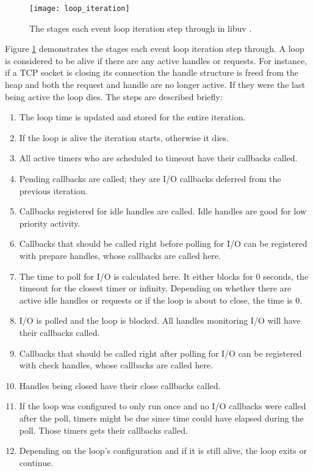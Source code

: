\begin{figure}[h]
  \texttt{[image: loop\_iteration]}
  \centering
  \caption[libuv event loop]{The stages each event loop iteration step through
  in libuv \cite{github2017libuv-loop_iteration}.}
  \label{fig:loop_iteration}
\end{figure}

Figure \ref{fig:loop_iteration} demonstrates the stages each event loop
iteration step through. A loop is considered to be alive if there are any
active handles or requests. For instance, if a TCP socket is closing its
connection the handle structure is freed from the heap and both the request and
handle are no longer active. If they were the last being active the loop dies.
The steps are described briefly: \cite{libuv-docs}

\begin{enumerate}
  \item The loop time is updated and stored for the entire iteration.
  \item If the loop is alive the iteration starts, otherwise it dies.
  \item All active timers who are scheduled to timeout have their callbacks
    called.
  \item Pending callbacks are called; they are I/O callbacks deferred from the previous
    iteration.
  \item Callbacks registered for idle handles are called. Idle handles are good
    for low priority activity.
  \item Callbacks that should be called right before polling for I/O can be
    registered with prepare handles, whose callbacks are called here.
  \item The time to poll for I/O is calculated here. It either blocks for 0
    seconds, the timeout for the closest timer or infinity. Depending on
    whether there are active idle handles or requests or if the loop is about
    to close, the time is 0. \label{item:poll_time_calculation}
  \item I/O is polled and the loop is blocked. All handles monitoring I/O will
    have their callbacks called.
  \item Callbacks that should be called right after polling for I/O can be
    registered with check handles, whose callbacks are called here.
  \item Handles being closed have their close callbacks called.
  \item If the loop was configured to only run once and no I/O callbacks were
    called after the poll, timers might be due since time could have elapsed
    during the poll. Those timers gets their callbacks called.
  \item Depending on the loop's configuration and if it is still alive, the
    loop exits or continue.
\end{enumerate}

